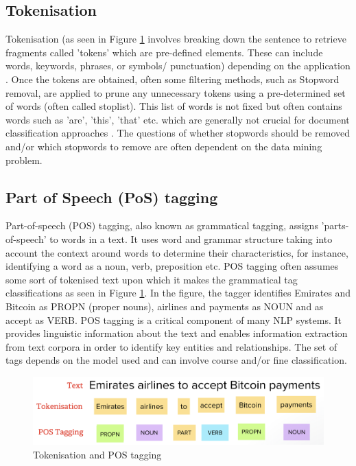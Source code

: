 \subsection{Tokenisation}
Tokenisation (as seen in Figure \ref{fig:tokenisation+pos} involves breaking down the sentence to retrieve fragments called 'tokens' which are pre-defined elements. These can include words, keywords, phrases, or symbols/ punctuation) depending on the application \cite{kannan2014preprocessing} \cite{ieee_named_entity}. Once the tokens are obtained, often some filtering methods, such as Stopword removal, are applied to prune any unnecessary tokens using a pre-determined set of words (often called stoplist). This list of words is not fixed but often contains words such as 'are', 'this', 'that' etc. which are generally not crucial for document classification approaches \cite{kannan2014preprocessing}. The questions of whether stopwords should be removed and/or which stopwords to remove are often dependent on the data mining problem.  

\subsection{Part of Speech (PoS) tagging}

Part-of-speech (POS) tagging, also known as grammatical tagging, assigns 'parts-of-speech' to words in a text.  It uses word and grammar structure taking into account  the context around words to determine their characteristics, for instance, identifying a word as a noun, verb, preposition etc. \cite{pos} POS tagging often assumes some sort of tokenised text upon which it makes the grammatical tag classifications as seen in Figure \ref{fig:tokenisation+pos}. In the figure, the tagger identifies Emirates and Bitcoin as PROPN (proper nouns), airlines and payments as NOUN and as accept as VERB. POS tagging is a critical component of
many NLP systems. It provides linguistic information about the text and enables information extraction from text corpora in order to identify key entities and relationships. The set of tags depends on the model used and can involve course and/or fine classification.


\begin{figure}[H]
\centering
\includegraphics[scale=0.35]{images/token+pos.png}
\caption{Tokenisation and POS tagging}
\label{fig:tokenisation+pos}
\end{figure}

